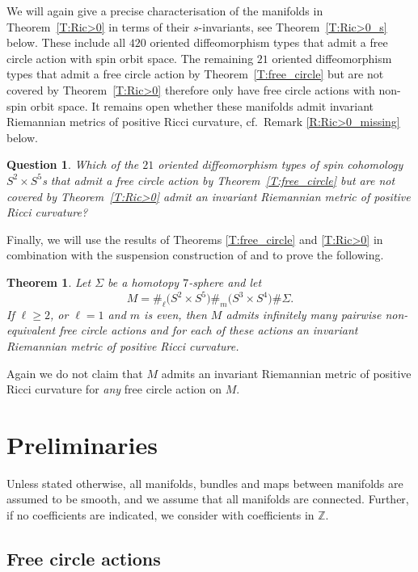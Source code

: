 \documentclass[10pt,a4paper]{amsart}
\numberwithin{equation}{section}
\newtheorem{theoremAlph}{Theorem}
\newtheorem{Question}[Theorem]{Question}
\theoremstyle{definition}
\numberwithin{table}{section}
\newcommand{\Z}{\mathbb{Z}}
\begin{document}
We will again give a precise characterisation of the manifolds in Theorem~\ref{T:Ric>0} in terms of their $s$-invariants, see Theorem~\ref{T:Ric>0_s} below. These include all $420$ oriented diffeomorphism types that admit a free circle action with spin orbit space. The remaining $21$ oriented diffeomorphism types that admit a free circle action by Theorem~\ref{T:free_circle} but are not covered by Theorem~\ref{T:Ric>0} therefore only have free circle actions with non-spin orbit space. It remains open whether these manifolds admit invariant Riemannian metrics of positive Ricci curvature, cf.\ Remark \ref{R:Ric>0_missing} below.
\begin{Question}\label{Q:Ric>0_missing}
	Which of the $21$ oriented diffeomorphism types of spin cohomology $S^2\times S^5$s that admit a free circle action by Theorem~\ref{T:free_circle} but are not covered by Theorem~\ref{T:Ric>0} admit an invariant Riemannian metric of positive Ricci curvature?
\end{Question}



Finally, we will use the results of Theorems \ref{T:free_circle} and \ref{T:Ric>0} in combination with the suspension construction of \cite{Du26} and \cite{GR25} to prove the following.
\begin{theoremAlph}\label{T:conn_sums}
	Let $\Sigma$ be a homotopy $7$-sphere and let
	\[ M=\#_\ell\bigl(S^2\times S^5\bigr)\#_m\bigl(S^3\times S^4\bigr)\#\Sigma. \]
	If $\ell\geq 2$, or $\ell=1$ and $m$ is even, then $M$ admits infinitely many pairwise non-equivalent free circle actions and for each of these actions an invariant Riemannian metric of positive Ricci curvature.
\end{theoremAlph}
Again we do not claim that $M$ admits an invariant Riemannian metric of positive Ricci curvature for \emph{any} free circle action on $M$.


\section{Preliminaries}\label{S:prel}

Unless stated otherwise, all manifolds, bundles and maps between manifolds are assumed to be smooth, and we assume that all manifolds are connected. Further, if no coefficients are indicated, we consider  with coefficients in $\Z$.

\subsection{Free circle actions}
\end{document}
